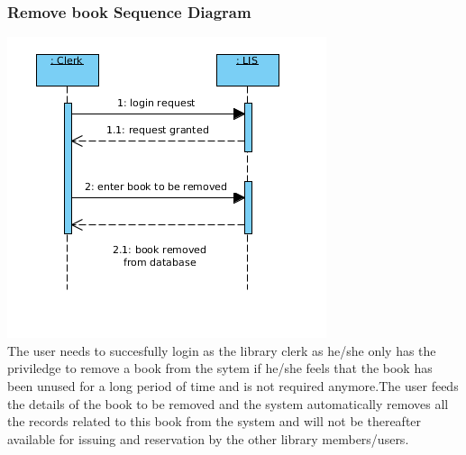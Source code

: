 \documentclass{article}
\begin{document}
\subsubsection*{Remove book Sequence Diagram}
\includegraphics[scale=0.50]{images/seqDiagBookRemoval.png}
\\
The user needs to succesfully login as the library clerk as he/she only has the priviledge to remove a book from the sytem if he/she feels that the book has been unused for a long period of time and is not required anymore.The user feeds the details of the book to be removed and the system automatically removes all the records related to this book from the system and will not be thereafter available for issuing and reservation by the other library members/users.
\\
\end{document}
